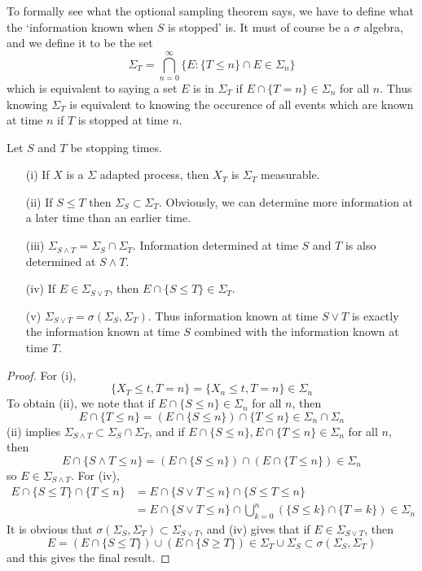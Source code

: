 To formally see what the optional sampling theorem says, we have to define what the `information known when $S$ is stopped' is. It must of course be a $\sigma$ algebra, and we define it to be the set
%
\[ \Sigma_T = \bigcap_{n = 0}^\infty \{ E: \{ T \leq n \} \cap E \in \Sigma_n \} \]
%
which is equivalent to saying a set $E$ is in $\Sigma_T$ if $E \cap \{ T = n \} \in \Sigma_n$ for all $n$. Thus knowing $\Sigma_T$ is equivalent to knowing the occurence of all events which are known at time $n$ if $T$ is stopped at time $n$.

\begin{lemma}
    Let $S$ and $T$ be stopping times.
    \begin{itemize}
        \item[(i)] If $X$ is a $\Sigma$ adapted process, then $X_T$ is $\Sigma_T$ measurable.
        \item[(ii)] If $S \leq T$ then $\Sigma_S \subset \Sigma_T$. Obviously, we can determine more information at a later time than an earlier time.
        \item[(iii)] $\Sigma_{S \wedge T} = \Sigma_S \cap \Sigma_T$. Information determined at time $S$ and $T$ is also determined at $S \wedge T$.
        \item[(iv)] If $E \in \Sigma_{S \vee T}$, then $E \cap \{ S \leq T \} \in \Sigma_T$.
        \item[(v)] $\Sigma_{S \vee T} = \sigma(\Sigma_S, \Sigma_T)$. Thus information known at time $S \vee T$ is exactly the information known at time $S$ combined with the information known at time $T$.
    \end{itemize}
\end{lemma}
\begin{proof}
    For (i),
    \[ \{ X_T \leq t, T = n \} = \{ X_n \leq t, T = n \} \in \Sigma_n \]
    To obtain (ii), we note that if $E \cap \{ S \leq n \} \in \Sigma_n$ for all $n$, then
    \[ E \cap \{ T \leq n \} = (E \cap \{ S \leq n \}) \cap \{ T \leq n \} \in \Sigma_n \cap \Sigma_n \]
    (ii) implies $\Sigma_{S \wedge T} \subset \Sigma_S \cap \Sigma_T$, and if $E \cap \{ S \leq n \}, E \cap \{ T \leq n \} \in \Sigma_n$ for all $n$, then
    \[ E \cap \{ S \wedge T \leq n \} = (E \cap \{ S \leq n \}) \cap (E \cap \{ T \leq n \}) \in \Sigma_n \]
    so $E \in \Sigma_{S \wedge T}$. For (iv),
    \begin{align*}
        E \cap \{ S \leq T \} \cap \{ T \leq n \} &= E \cap \{ S \vee T \leq n \} \cap \{ S \leq T \leq n \}\\
        &= E \cap \{ S \vee T \leq n \} \cap \bigcup_{k = 0}^n (\{ S \leq k \} \cap \{ T = k \}) \in \Sigma_n
    \end{align*}
    It is obvious that $\sigma(\Sigma_S, \Sigma_T) \subset \Sigma_{S \vee T}$, and (iv) gives that if $E \in \Sigma_{S \vee T}$, then
    \[ E = (E \cap \{ S \leq T \}) \cup (E \cap \{ S \geq T \}) \in \Sigma_T \cup \Sigma_S \subset \sigma(\Sigma_S, \Sigma_T) \]
    and this gives the final result.
\end{proof}

